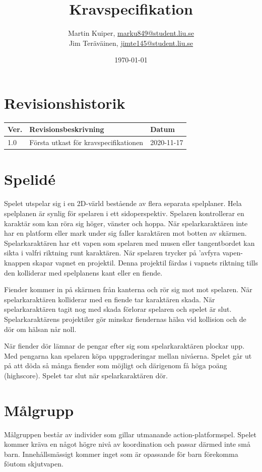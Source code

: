 \documentclass{TDP005mall}
\author{Martin Kuiper, \url{marku849@student.liu.se}\\
  Jim Teräväinen, \url{jimte145@student.liu.se}}
\title{Kravspecifikation}
\date{\today}
\begin{document}
\projectpage
\section{Revisionshistorik}
\begin{table}[!h]
\begin{tabularx}{\linewidth}{|l|X|l|}
\hline
Ver. & Revisionsbeskrivning & Datum \\\hline
1.0 & Första utkast för kravspecifikationen & 2020-11-17 \\\hline
\end{tabularx}
\end{table}


\section{Spelidé}
Spelet utspelar sig i en 2D-värld bestående av flera separata spelplaner. Hela spelplanen är synlig för spelaren i ett sidoperspektiv. Spelaren kontrollerar en karaktär som kan röra sig höger, vänster och hoppa. När spelarkaraktären inte har en platform eller mark under sig faller karaktären mot botten av skärmen. Spelarkaraktären har ett vapen som spelaren med musen eller tangentbordet kan sikta i valfri riktning runt karaktären. När spelaren trycker på 'avfyra vapen-knappen skapar vapnet en projektil. Denna projektil färdas i vapnets riktning tills den kolliderar med spelplanens kant eller en fiende.

Fiender kommer in på skärmen från kanterna och rör sig mot mot spelaren. När spelarkaraktären kolliderar med en fiende tar karaktären skada. När spelarkaraktären tagit nog med skada förlorar spelaren och spelet är slut. Spelarkaraktärens projektiler gör minskar fiendernas hälsa vid kollision och de dör om hälsan når noll. 

När fiender dör lämnar de pengar efter sig som spelarkaraktären plockar upp. Med pengarna kan spelaren köpa uppgraderingar mellan nivåerna. Spelet går ut på att döda så många fiender som möjligt och därigenom få höga poäng (highscore). Spelet tar slut när spelarkaraktären dör.


\section{Målgrupp}
Målgruppen består av individer som gillar utmanande action-platformspel. Spelet kommer kräva en något högre nivå av koordination och passar därmed inte små barn. Innehållsmässigt kommer inget som är opassande för barn förekomma föutom skjutvapen.
\end{document}
